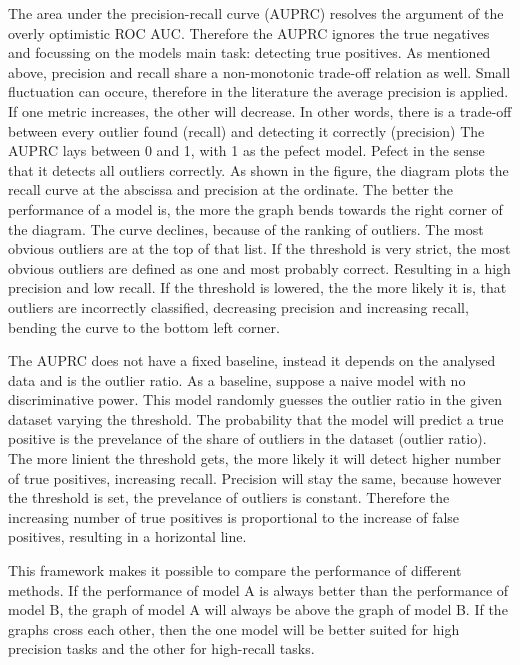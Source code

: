 The area under the precision-recall curve (AUPRC) resolves the argument of the overly optimistic ROC AUC.
Therefore the AUPRC ignores the true negatives and focussing on the models main task: detecting true positives.
As mentioned above, precision and recall share a non-monotonic trade-off relation as well.
Small fluctuation can occure, therefore in the literature the average precision is applied. 
If one metric increases, the other will decrease.
In other words, there is a trade-off between every outlier found (recall) and detecting it correctly (precision)
The AUPRC lays between 0 and 1, with 1 as the pefect model.
Pefect in the sense that it detects all outliers correctly.
As shown in the figure, the diagram plots the recall curve at the abscissa and precision at the ordinate.
The better the performance of a model is, the more the graph bends towards the right corner of the diagram.
The curve declines, because of the ranking of outliers. 
The most obvious outliers are at the top of that list.
If the threshold is very strict, the most obvious outliers are defined as one and most probably correct.
Resulting in a high precision and low recall.
If the threshold is lowered, the the more likely it is, that outliers are incorrectly classified, decreasing precision and increasing recall, bending the curve to the bottom left corner.


The AUPRC does not have a fixed baseline, instead it depends on the analysed data and is the outlier ratio.
As a baseline, suppose a naive model with no discriminative power.
This model randomly guesses the outlier ratio in the given dataset varying the threshold.
The probability that the model will predict a true positive is the prevelance of the share of outliers in the dataset (outlier ratio).
The more linient the threshold gets, the more likely it will detect higher number of true positives, increasing recall.
Precision will stay the same, because however the threshold is set, the prevelance of outliers is constant.
Therefore the increasing number of true positives is proportional to the increase of false positives, resulting in a horizontal line.


This framework makes it possible to compare the performance of different methods. 
If the performance of model A is always better than the performance of model B, the graph of model A will always be above the graph of model B.
If the graphs cross each other, then the one model will be better suited for high precision tasks and the other for high-recall tasks.


